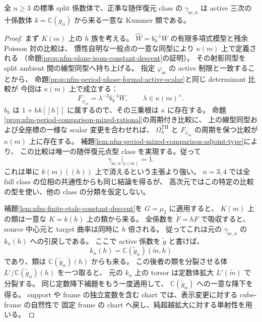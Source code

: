 \begin{theorem}[周期位相は混合係数に依存しない]
\label{thm:nfm-period-phase-active-descent}
全 $n\ge3$ の標準 split 係数体で、正準な随伴復元 class の
$\gamma_{\mathrm{sc},n}$ は
active 三次の十係数体 $k=\mathbb C(g_\alpha)$ から来る一意な Kummer 類である。
\end{theorem}

\begin{proof}
まず $K(m)$ 上の $h$ 族を考える。
$\widehat W=b_h^{-1}W$ の有限多項式模型と残余 Poisson 対の比較は、
慣性自明な一般点の一意な同型により $\kappa(m)$ 上で定義される
（命題\ref{prop:nfm-plane-isom-constant-descent}の証明）。
その射影同型を split ambient 間の線型同型へ持ち上げる。
指定 $\varphi_{\mathrm{sc}}$ の active 制限と一致することから、
命題\ref{prop:nfm-period-phase-formal-active-scalar}と同じ determinant 比較が
今回は $\kappa(m)$ 上で成立する：
\[
 F_{\varphi_{\mathrm{sc}}}=\lambda^{-3}b_h^{-1}W,
 \qquad\lambda\in\kappa(m)^\times.
\]
$b_h$ は $1+h k[[h]]$ に属するので、その三乗根は $\kappa$ に存在する。
命題\ref{prop:nfm-period-comparison-mixed-rational}の周期付き比較に、
上の線型同型および全座標の一様な scalar 変更を合わせれば、
$\Omega_h^{\mathrm{TH}}$ と $F_{\varphi_{\mathrm{sc}}}$ の周期を保つ比較が
$\kappa(m)$ 上に存在する。
補題\ref{lem:nfm-period-mixed-comparison-adjoint-type}により、
この比較は唯一の随伴復元点型 class を実現する。従って
\[
 \gamma_{\mathrm{sc},n}|_{\kappa(m)}=1.
\]
これは単に $k(m)((h))$ 上で消えるという主張より強い。
$n=3,4$ では全 full class の位相の共通性からも同じ結論を得るが、
高次元ではこの特定の比較の型を使い、他の class の分類を仮定しない。

補題\ref{lem:nfm-finite-etale-constant-descent}を $G=\mu_3$ に適用すると、
$K(m)$ 上の類は一意な $K=k(h)$ 上の類から来る。
全係数を $\widetilde F=hF$ で吸収すると、source 中心元と target 曲率は同時に $h$ 倍される。
従ってこれは元の $\gamma_{\mathrm{sc},n}$ の $k_n(h)$ への引戻しである。
ここで active 係数を $\widetilde g$ と書けば、
\[
 k_n(h)=\mathbb C(\widetilde g_\alpha)(\widetilde m,h)
\]
であり、類は $\mathbb C(\widetilde g_\alpha)(h)$ からも来る。
この後者の類を分裂させる体 $L'/\mathbb C(\widetilde g_\alpha)(h)$ を一つ取ると、
元の $k_n$ 上の torsor は定数体拡大 $L'(\widetilde m)$ で分裂する。
同じ定数降下補題をもう一度適用して、
$\mathbb C(\widetilde g_\alpha)$ への一意な降下を得る。
support や frame の独立変数を含む chart では、表示変更に対する cube-frame の自然性で
固定 frame の chart へ戻し、純超越拡大に対する単射性を用いる。
\end{proof}

